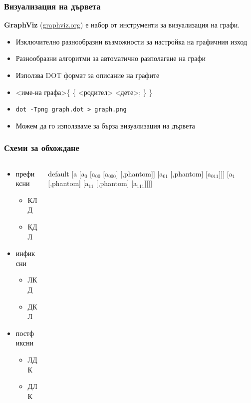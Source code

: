 \documentclass[alsotrans]{beamerswitch}
\newcommand{\samplebintree}{%
      \begin{forest}
        default
        [a [a$_0$ [a$_{00}$ [a$_{000}$] [,phantom]] [a$_{01}$ [,phantom] [a$_{011}$]]] [a$_1$ [,phantom] [a$_{11}$ [,phantom] [a$_{111}$]]]]
      \end{forest}%
}
\begin{document}
\begin{frame}
  \frametitle{Визуализация на дървета}
  \textbf{GraphViz} (\url{graphviz.org}) е набор от инструменти за визуализация на графи.

  \begin{itemize}
  \item Изключително разнообразни възможности за настройка на графичния изход
  \item Разнообразни алгоритми за автоматично разполагане на графи
  \item Използва DOT формат за описание на графите
  \item {}<име-на графа>\tta\{ \{ <родител> \tta{->} <дете>\tta; \} \tta\}
  \item \tt{dot -Tpng graph.dot > graph.png}
  \item Можем да го използваме за бърза визуализация на дървета
  \end{itemize}

\end{frame}

\begin{frame}
  \frametitle{Схеми за обхождане}
  \begin{columns}[t,onlytextwidth]
    \begin{column}{0.35\textwidth}
      \begin{itemize}
      \item префиксни
        \begin{itemize}
        \item КЛД
        \item КДЛ
        \end{itemize}
      \item инфиксни
        \begin{itemize}
        \item ЛКД
        \item ДКЛ
        \end{itemize}
      \item постфиксни
        \begin{itemize}
        \item ЛДК
        \item ДЛК
        \end{itemize}
      \end{itemize}
    \end{column}
    \begin{column}{0.65\textwidth}
      \begin{center}
        \samplebintree
      \end{center}
    \end{column}
  \end{columns}
\end{frame}
\end{document}
